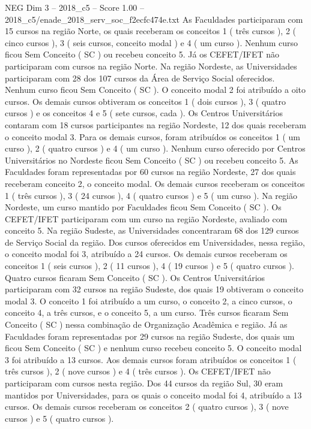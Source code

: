 \begin{textsample}{NEG Dim 3 – 2018\_c5 – Score 1.00 – 2018\_c5/enade\_2018\_serv\_soc\_f2ecfc474e.txt}
As Faculdades participaram com 15 cursos na região Norte, os quais receberam os conceitos 1 ( três cursos ), 2 ( cinco cursos ), 3 ( seis cursos, conceito modal ) e 4 ( um curso ).
Nenhum curso ficou Sem Conceito ( SC ) ou recebeu conceito 5.
Já os CEFET/IFET não participaram com cursos na região Norte.
Na região Nordeste, as Universidades participaram com 28 dos 107 cursos da Área de Serviço Social oferecidos.
Nenhum curso ficou Sem Conceito ( SC ).
O conceito modal 2 foi atribuído a oito cursos.
Os demais cursos obtiveram os conceitos 1 ( dois cursos ), 3 ( quatro cursos ) e os conceitos 4 e 5 ( sete cursos, cada ).
Os Centros Universitários contaram com 18 cursos participantes na região Nordeste, 12 dos quais receberam o conceito modal 3.
Para os demais cursos, foram atribuídos os conceitos 1 ( um curso ), 2 ( quatro cursos ) e 4 ( um curso ).
Nenhum curso oferecido por Centros Universitários no Nordeste ficou Sem Conceito ( SC ) ou recebeu conceito 5.
As Faculdades foram representadas por 60 cursos na região Nordeste, 27 dos quais receberam conceito 2, o conceito modal.
Os demais cursos receberam os conceitos 1 ( três cursos ), 3 ( 24 cursos ), 4 ( quatro cursos ) e 5 ( um curso ).
Na região Nordeste, um curso mantido por Faculdades ficou Sem Conceito ( SC ).
Os CEFET/IFET participaram com um curso na região Nordeste, avaliado com conceito 5.
Na região Sudeste, as Universidades concentraram 68 dos 129 cursos de Serviço Social da região.
Dos cursos oferecidos em Universidades, nessa região, o conceito modal foi 3, atribuído a 24 cursos.
Os demais cursos receberam os conceitos 1 ( seis cursos ), 2 ( 11 cursos ), 4 ( 19 cursos ) e 5 ( quatro cursos ).
Quatro cursos ficaram Sem Conceito ( SC ).
Os Centros Universitários participaram com 32 cursos na região Sudeste, dos quais 19 obtiveram o conceito modal 3.
O conceito 1 foi atribuído a um curso, o conceito 2, a cinco cursos, o conceito 4, a três cursos, e o conceito 5, a um curso.
Três cursos ficaram Sem Conceito ( SC ) nessa combinação de Organização Acadêmica e região.
Já as Faculdades foram representadas por 29 cursos na região Sudeste, dos quais um ficou Sem Conceito ( SC ) e nenhum curso recebeu conceito 5.
O conceito modal 3 foi atribuído a 13 cursos.
Aos demais cursos foram atribuídos os conceitos 1 ( três cursos ), 2 ( nove cursos ) e 4 ( três cursos ).
Os CEFET/IFET não participaram com cursos nesta região.
Dos 44 cursos da região Sul, 30 eram mantidos por Universidades, para os quais o conceito modal foi 4, atribuído a 13 cursos.
Os demais cursos receberam os conceitos 2 ( quatro cursos ), 3 ( nove cursos ) e 5 ( quatro cursos ).

\end{textsample}
